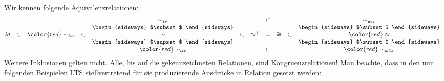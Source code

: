 \documentclass[10pt, landscape]{article}
\begin{document}
Wir kennen folgende Äquivalenzrelationen:
\newcommand{\ssubset}{\begin{sideways} $\subset$ \end{sideways}}
\newcommand{\ssupset}{\begin{sideways} $\supset$ \end{sideways}}
\newcommand{\noCongr}[1]{{\color{red}#1}}
\[\begin{array} {@{}ccccccccccc}
    &         &                      &         & \sim_{tr}            &         &        & \subset &   &         & \sim_{wtr}            \\
    &         &                      &         & \ssubset             &         &            & &       &         & \ssubset              \\
id  & \subset & \noCongr{\sim_{iso}} & \subset & \sim                 & \subset &  \approx^+ &=& \cong & \subset & \noCongr{\approx}     \\ 
    &         &                      &         & \ssupset             &         &            & &       &         & \ssupset              \\
    &         &                      &         & \noCongr{\sim_{ttr}} &         &        & \subset &   &         & \noCongr{\sim_{wttr}} \\
\end{array}\]
Weitere Inklusionen gelten nicht. Alle, bis auf die \noCongr{gekennzeichneten} Relationen, sind Kongruenzrelationen!
Man beachte, dass in den nun folgenden Beispielen LTS stellvertretend für sie produzierende Ausdrücke in Relation gesetzt werden:
\vspace{0.3cm}

\begin{column}{.44}
	\small
	\vspace {3cm}
	
	\begin{column}{.5}
		\hspace{0.5cm}
	\end{column}

\hspace{2cm}	

	\small
	
\hspace{1cm}	

	
\end{column}
\end{document}
